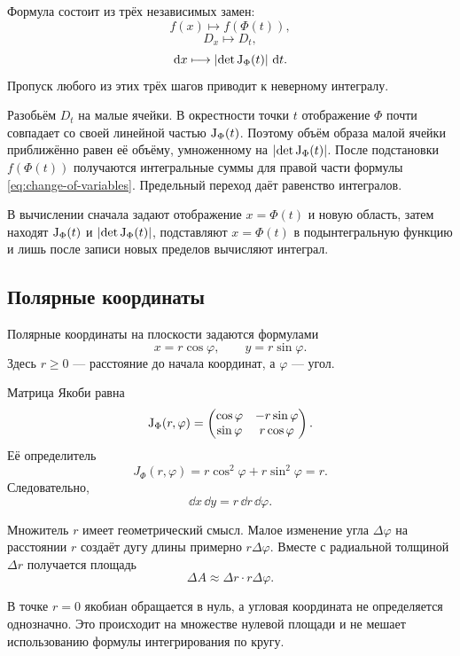 Формула состоит из трёх независимых замен:
\[
f(x)\longmapsto f(\Phi(t)),
\]
\[
D_x\longmapsto D_t,
\]
\[
\mathop{}\!\mathrm{d} x\longmapsto
\lvert\det\mathrm{J}_{\Phi}(t)\rvert\,\mathop{}\!\mathrm{d} t.
\]
Пропуск любого из этих трёх шагов приводит к неверному интегралу.

\begin{proofidea}
Разобьём $D_t$ на малые ячейки. В окрестности точки $t$ отображение $\Phi$ почти совпадает со своей линейной частью $\mathrm{J}_{\Phi}(t)$. Поэтому объём образа малой ячейки приближённо равен её объёму, умноженному на $\lvert\det\mathrm{J}_{\Phi}(t)\rvert$. После подстановки $f(\Phi(t))$ получаются интегральные суммы для правой части формулы \eqref{eq:change-of-variables}. Предельный переход даёт равенство интегралов.
\end{proofidea}

В вычислении сначала задают отображение \(x=\Phi(t)\) и новую область, затем находят \(\mathrm{J}_{\Phi}(t)\) и \(\lvert\det\mathrm{J}_{\Phi}(t)\rvert\), подставляют \(x=\Phi(t)\) в подынтегральную функцию и лишь после записи новых пределов вычисляют интеграл.

\subsection{Полярные координаты}

Полярные координаты на плоскости задаются формулами
\begin{equation}
\label{eq:polar-coordinates}
x=r\cos\varphi,
\qquad
y=r\sin\varphi.
\end{equation}
Здесь $r\geq0$ --- расстояние до начала координат, а $\varphi$ --- угол.

Матрица Якоби равна
\[
\mathrm{J}_{\Phi}(r,\varphi)
=
\begin{pmatrix}
\cos\varphi&-r\sin\varphi\\
\sin\varphi&r\cos\varphi
\end{pmatrix}.
\]
Её определитель
\[
J_{\Phi}(r,\varphi)
=
r\cos^2\varphi+r\sin^2\varphi
=r.
\]
Следовательно,
\begin{equation}
\label{eq:polar-area-element}
\dd x\,\dd y
=
r\,\dd r\,\dd\varphi.
\end{equation}

Множитель $r$ имеет геометрический смысл. Малое изменение угла $\Delta\varphi$ на расстоянии $r$ создаёт дугу длины примерно $r\Delta\varphi$. Вместе с радиальной толщиной $\Delta r$ получается площадь
\[
\Delta A
\approx
\Delta r\cdot r\Delta\varphi.
\]

В точке $r=0$ якобиан обращается в нуль, а угловая координата не определяется однозначно. Это происходит на множестве нулевой площади и не мешает использованию формулы интегрирования по кругу.

